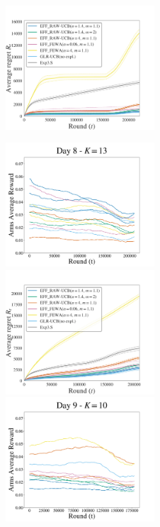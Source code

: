 \begin{figure}[p!]
\includegraphics[clip, width= 0.495\textwidth]{2.2Restless/fig/DAY7.pdf}
\end{figure}
\begin{figure}[p!]
\includegraphics[clip, width= 0.495\textwidth]{2.2Restless/fig/reward_plot_day8.pdf}
\includegraphics[clip, width= 0.495\textwidth]{2.2Restless/fig/DAY8.pdf}
\includegraphics[clip, width= 0.495\textwidth]{2.2Restless/fig/reward_plot_day9.pdf}

\end{figure}
